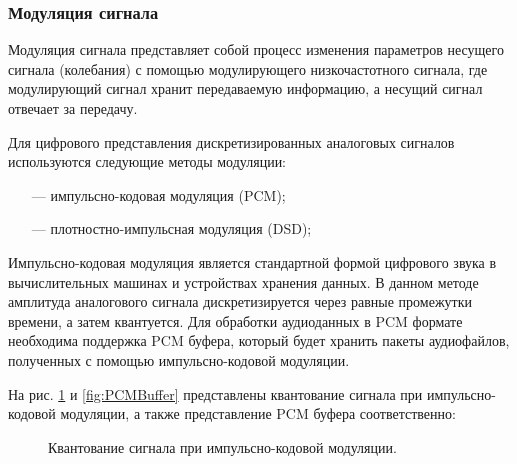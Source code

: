 	\subsubsection*{Модуляция сигнала}
		\par Модуляция сигнала представляет собой процесс изменения параметров несущего сигнала (колебания) 
		с помощью модулирующего низкочастотного сигнала, где модулирующий сигнал хранит передаваемую информацию, 
		а несущий сигнал отвечает за передачу.

		Для цифрового представления дискретизированных аналоговых сигналов используются следующие методы модуляции:
		\begin{itemize}
			\item[---] импульсно-кодовая модуляция (PCM);
			\item[---] плотностно-импульсная модуляция (DSD);
		\end{itemize}

		\par Импульсно-кодовая модуляция \cite{PCM:DSD} является стандартной формой цифрового звука в вычислительных машинах
		и устройствах хранения данных. 
		В данном методе амплитуда аналогового сигнала дискретизируется через равные промежутки времени, 
		а затем квантуется. 
		Для обработки аудиоданных в PCM формате необходима поддержка PCM буфера, 
		который будет хранить пакеты аудиофайлов, полученных с помощью импульсно-кодовой модуляции.

		\par На рис. \ref{fig:PCMKvant} и \ref{fig:PCMBuffer} представлены квантование сигнала при импульсно-кодовой модуляции, 
		а также представление PCM буфера соответственно:

		\begin{figure}[!h]
			\caption{Квантование сигнала при импульсно-кодовой модуляции.}
			\label{fig:PCMKvant}
		\end{figure}

